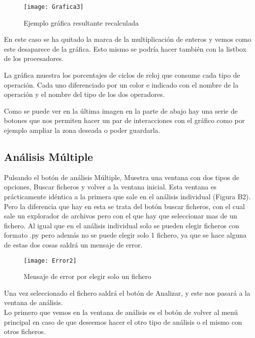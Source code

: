 \begin{enumerate}
\begin{figure}[H]
\centering
\texttt{[image: Grafica3]}
\caption{Ejemplo gráfica resultante recalculada}
\end{figure}

\end{enumerate}

En este caso se ha quitado la marca de la multiplicación de enteros y vemos como este desaparece de la gráfica. Esto mismo se podría hacer también con la listbox de los procesadores.

La gráfica muestra los porcentajes de ciclos de reloj que consume cada tipo de operación. Cada uno diferenciado por un color e indicado con el nombre de la operación y el nombre del tipo de los dos operadores.

Como se puede ver en la última imagen en la parte de abajo hay una serie de botones que nos permiten hacer un par de interacciones con el gráfico como por ejemplo ampliar la zona deseada o poder guardarla.

\subsection{Análisis Múltiple}
Pulsando el botón de análisis Múltiple, Muestra una ventana con dos tipos de opciones, Buscar ficheros y volver a la ventana inicial. Esta ventana es prácticamente idéntica a la primera que sale en el análisis individual (Figura B2). Pero la diferencia que hay en esta se trata del botón buscar ficheros, con el cual sale un explorador de archivos pero con el que hay que seleccionar mas de un fichero. Al igual que en el análisis individual solo se pueden elegir ficheros con formato .py pero además no se puede elegir solo 1 fichero, ya que se hace alguna de estas dos cosas saldrá un mensaje de error.\\

\begin{figure}[H]
\centering
\texttt{[image: Error2]}
\caption{Mensaje de error por elegir solo un fichero}
\end{figure}

Una vez seleccionado el fichero saldrá el botón de Analizar, y este nos pasará a la ventana de análisis.\\
Lo primero que vemos en la ventana de análisis es el botón de volver al menú principal en caso de que deseemos hacer el otro tipo de análisis o el mismo con otros ficheros.\\

